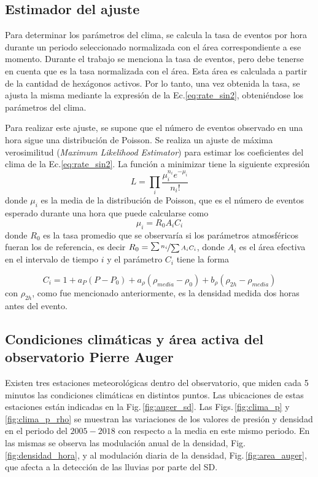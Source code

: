 \subsection{Estimador del ajuste}

Para determinar los parámetros del clima, se calcula la tasa de eventos por hora durante un periodo seleccionado normalizada con el área correspondiente a ese momento. Durante el trabajo se menciona la tasa de eventos, pero debe tenerse en cuenta que es la tasa normalizada con el área. Esta área es calculada a partir de la cantidad de hexágonos activos. Por lo tanto, una vez obtenida la tasa, se ajusta la misma mediante la expresión de la Ec.\ref{eq:rate_sin2}, obteniéndose los parámetros del clima.

Para realizar este ajuste, se supone que el número de eventos observado en una hora sigue una distribución de Poisson. Se realiza un ajuste de máxima verosimilitud (\emph{Maximum Likelihood Estimator}) para estimar los coeficientes del clima de la Ec.\ref{eq:rate_sin2}. La función a minimizar tiene la siguiente expresión 
\begin{equation}
	L=\prod_i\frac{\mu_i^{n_i} e^{-\mu_i}}{n_i!}
\end{equation}
donde $\mu_i$ es la media de la distribución de Poisson, que es el número de eventos esperado durante una hora que puede calcularse como
\begin{equation}
	\mu_i = R_0A_iC_i
\end{equation}
donde $R_0$ es la tasa promedio que se observaría si los parámetros atmosféricos fueran los de referencia, es decir $R_0=\nicefrac{\sum n_i}{\sum A_iC_i}$, donde $A_i$ es el área efectiva en el intervalo de tiempo $i$ y el parámetro $C_i$ tiene la forma

\begin{equation}
	C_i = 1+a_P(P-P_0) +a_{\rho}(\rho_{media}-\rho_0) + b_{\rho}(\rho_{2h}-\rho_{media}) 
\end{equation}
con $\rho_{2h}$, como fue mencionado anteriormente, es la densidad medida dos horas antes del evento.

\subsection{Condiciones climáticas y área activa del observatorio Pierre Auger}

Existen tres estaciones meteorológicas dentro del observatorio, que miden cada 5 minutos las condiciones climáticas en distintos puntos. Las ubicaciones de estas estaciones están indicadas en la Fig.\,\ref{fig:auger_sd}. Las Figs.\,\ref{fig:clima_p} y \ref{fig:clima_p_rho} se muestran las variaciones de los valores de presión y densidad en el periodo del $2005-2018$ con respecto a la media en este mismo periodo. En las mismas se observa las modulación anual de la densidad, Fig.\,\ref{fig:densidad_hora}, y al modulación diaria de la densidad, Fig.\,\ref{fig:area_auger}, que afecta a la detección de las lluvias por parte del SD. 

